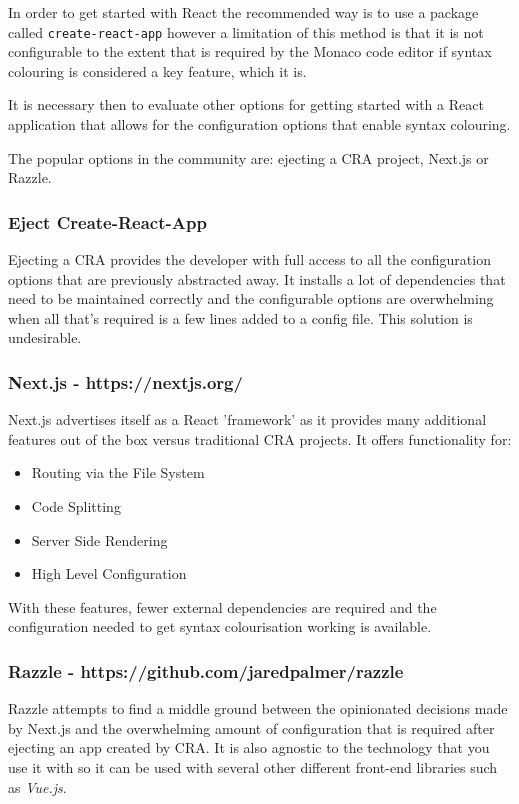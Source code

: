 In order to get started with React the recommended way is to use a package called \texttt{create-react-app} however a limitation of this method is that it is not configurable to the extent that is required by the Monaco code editor if syntax colouring is considered a key feature, which it is.

It is necessary then to evaluate other options for getting started with a React application that allows for the configuration options that enable syntax colouring.

The popular options in the community are: ejecting a CRA project, Next.js or Razzle.

\subsubsection{Eject Create-React-App}
Ejecting a CRA provides the developer with full access to all the configuration options that are previously abstracted away. It installs a lot of dependencies that need to be maintained correctly and the configurable options are overwhelming when all that's required is a few lines added to a config file. This solution is undesirable.

\subsubsection{Next.js - https://nextjs.org/}
Next.js advertises itself as a React 'framework' as it provides many additional features out of the box versus traditional CRA projects. It offers functionality for:

\begin{itemize}
  \item Routing via the File System
  \item Code Splitting
  \item Server Side Rendering
  \item High Level Configuration
\end{itemize}

With these features, fewer external dependencies are required and the configuration needed to get syntax colourisation working is available.

\subsubsection{Razzle - https://github.com/jaredpalmer/razzle}

Razzle attempts to find a middle ground between the opinionated decisions made by Next.js and the overwhelming amount of configuration that is required after ejecting an app created by CRA. It is also agnostic to the technology that you use it with so it can be used with several other different front-end libraries such as \textit{Vue.js}.

